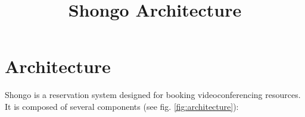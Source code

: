 
\usepackage{titlesec}

\titleformat{\chapter}[display]
    {\normalfont\huge\bfseries}{\chaptertitlename\ \thechapter}{20pt}{\Huge}
\titlespacing*{\chapter}{0pt}{0pt}{30pt}
\addtolength{\textheight}{2cm}
\setlength{\hoffset}{-20pt}
\addtolength{\textwidth}{40pt}



\title{Shongo Architecture}
\maketitle
\tableofcontents





\chapter{Architecture}

Shongo is a reservation system designed for booking videoconferencing resources. It is composed of several components (see fig. \ref{fig:architecture}):

